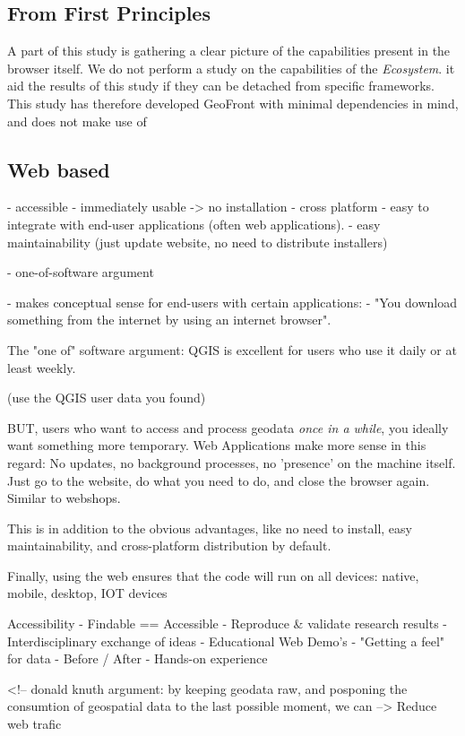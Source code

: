 \subsection{ From First Principles }
A part of this study is gathering a clear picture of the capabilities present in the browser itself. We do not perform a study on the capabilities of the \emph{Ecosystem}. it aid the results of this study if they can be detached from specific frameworks.
This study has therefore developed GeoFront with minimal dependencies in mind, and does not make use of 


\subsection{ Web based }

- accessible
    - immediately usable -> no installation
    - cross platform
    - easy to integrate with end-user applications (often web applications).
    - easy maintainability (just update website, no need to distribute installers)

- one-of-software argument

- makes conceptual sense for end-users with certain applications: 
  - "You download something from the internet by using an internet browser".

The "one of" software argument: QGIS is excellent for users who use it daily or at least weekly. 

(use the QGIS user data you found)

BUT, users who want to access and process geodata \emph{once in a while}, you ideally want something more temporary. Web Applications make more sense in this regard: No updates, no background processes, no 'presence' on the machine itself. Just go to the website, do what you need to do, and close the browser again. Similar to webshops.

This is in addition to the obvious advantages, like no need to install, easy maintainability, and cross-platform distribution by default.

Finally, using the web ensures that the code will run on all devices: native, mobile, desktop, IOT devices


Accessibility
- Findable == Accessible
- Reproduce \& validate research results 
- Interdisciplinary exchange of ideas 
- Educational Web Demo's
- "Getting a feel" for data 
   - Before / After
   - Hands-on experience

<!-- donald knuth argument: by keeping geodata raw, and posponing the consumtion of geospatial data to the last possible moment, we can  -->
Reduce web trafic

